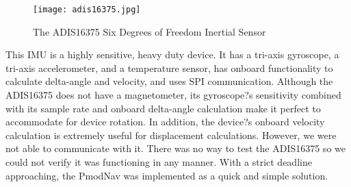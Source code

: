 \begin{figure}[H]
	\centerline{\texttt{[image: adis16375.jpg]}}
	\caption{The ADIS16375 Six Degrees of Freedom Inertial Sensor \cite{adisBreakout}}
	\label{adis16375}
\end{figure}

This IMU is a highly sensitive, heavy duty device. It has a tri-axis gyroscope, a tri-axis accelerometer, and a temperature sensor, has onboard functionality to calculate delta-angle and velocity, and uses SPI communication. Although the ADIS16375 does not have a magnetometer, its gyroscope?s sensitivity combined with its sample rate and onboard delta-angle calculation make it perfect to accommodate for device rotation. In addition, the device?s onboard velocity calculation is extremely useful for displacement calculations. However, we were not able to communicate with it. There was no way to test the ADIS16375 so we could not verify it was functioning in any manner. With a strict deadline approaching, the PmodNav was implemented as a quick and simple solution.




